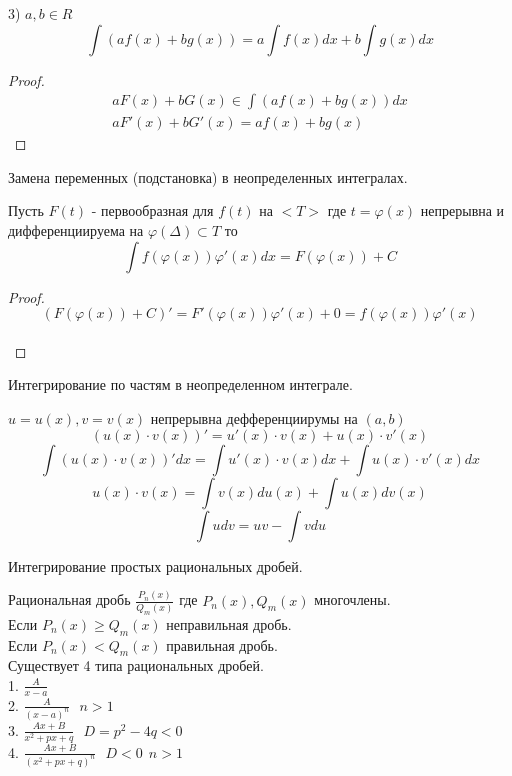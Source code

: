 3) $a, b \in R$\\
\[\int (af(x) + bg(x)) = a \int f(x)dx + b \int g(x)dx\]
\begin{proof}
  \begin{eqnarray*}
    aF(x) + bG(x) \in \int (af(x) + bg(x))dx\\
    aF'(x) + bG'(x) = af(x) + bg(x)
  \end{eqnarray*}
\end{proof}

\begin{title}[\Large]
  Замена переменных (подстановка) в неопределенных интегралах.
\end{title}

\begin{theorem}
  Пусть $F(t)$ - первообразная для $f(t)$ на $<T>$ где $t = \varphi (x)$
  непрерывна и дифференциируема на $\varphi(\Delta) \subset T$ то\\
  \[\int f(\varphi (x)) \varphi'(x)dx = F(\varphi (x)) + C\]
\end{theorem}

\begin{proof}
  \[(F(\varphi(x)) + C)' = F'(\varphi (x)) \varphi'(x) + 0 = f(\varphi(x))
    \varphi'(x)\]\\
\end{proof}

\begin{title}[\Large]
  Интегрирование по частям в неопределенном интеграле.
\end{title}
$u = u(x), v = v(x)$ непрерывна дефференциирумы на $(a,b)$
$$(u(x)\cdot v(x))' = u'(x)\cdot v(x) + u(x)\cdot v'(x)$$
$$\int(u(x)\cdot v(x))'dx = \int u'(x)\cdot v(x)dx + \int u(x)\cdot v'(x)dx$$
$$u(x)\cdot v(x) = \int v(x)du(x) + \int u(x)dv(x)$$
\[\int udv = uv - \int vdu\]

\begin{title}[\Large]
  Интегрирование простых рациональных дробей.
\end{title}
Рациональная дробь $\frac{P_n(x)}{Q_m(x)}$ где $P_n(x), Q_m(x)$ многочлены.\\
Если $P_n(x) \ge Q_m(x)$ неправильная дробь.\\
Если $P_n(x) < Q_m(x)$ правильная дробь.\\

Существует 4 типа рациональных дробей.\\
1. $\frac{A}{x-a}$\\
2. $\frac{A}{(x-a)^n} ~~~ n > 1$\\
3. $\frac{Ax + B}{x^2 + px +q} ~~~ D = p^2 - 4q < 0$\\
4. $\frac{Ax + B}{(x^2 + px +q)^n} ~~~ D < 0 ~~ n > 1$\\

